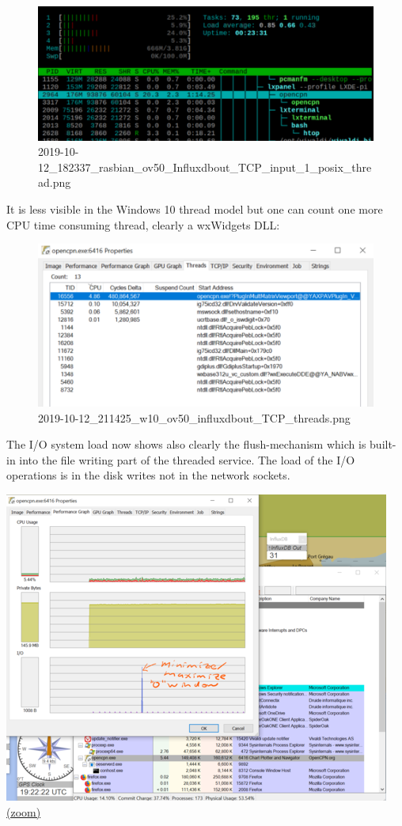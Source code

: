\documentclass[11pt]{article}
\begin{document}
    \begin{figure}
\centering
\includegraphics{2019-10-12_182337_rasbian_ov50_Influxdbout_TCP_input_1_posix_thread.png}
\caption{2019-10-12\_182337\_rasbian\_ov50\_Influxdbout\_TCP\_input\_1\_posix\_thread.png}
\end{figure}

    It is less visible in the Windows 10 thread model but one can count one
more CPU time consuming thread, clearly a wxWidgets DLL:

    \begin{figure}
\centering
\includegraphics{2019-10-12_211425_w10_ov50_influxdbout_TCP_threads.png}
\caption{2019-10-12\_211425\_w10\_ov50\_influxdbout\_TCP\_threads.png}
\end{figure}

    The I/O system load now shows also clearly the flush-mechanism which is
built-in into the file writing part of the threaded service. The load of
the I/O operations is in the disk writes not in the network sockets.

    \includegraphics{2019-10-12_211425_w10_ov50_influxdbout_TCP_perfgraph.png}
\href{img/2019-10-12_211425_w10_ov50_influxdbout_TCP_perfgraph.png}{(zoom)}
\end{document}
